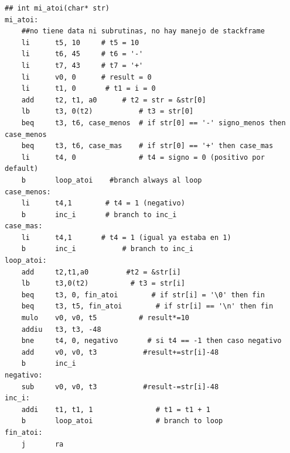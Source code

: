\documentclass[a4paper,10pt]{article}
\numberwithin{equation}{section}
\numberwithin{figure}{section}
\begin{document}
\begin{lstlisting}
## int mi_atoi(char* str)
mi_atoi:
    ##no tiene data ni subrutinas, no hay manejo de stackframe
    li      t5, 10     # t5 = 10
    li      t6, 45     # t6 = '-'
    li      t7, 43     # t7 = '+'
    li      v0, 0      # result = 0
    li		t1, 0		# t1 = i = 0
    add		t2, t1, a0		# t2 = str = &str[0]
    lb		t3, 0(t2)		    # t3 = str[0]
    beq		t3, t6, case_menos 	# if str[0] == '-' signo_menos then case_menos
    beq		t3, t6, case_mas	# if str[0] == '+' then case_mas
    li		t4, 0		        # t4 = signo = 0 (positivo por default)
    b       loop_atoi    #branch always al loop
case_menos:
    li		t4,1 		# t4 = 1 (negativo)
    b       inc_i       # branch to inc_i
case_mas:
    li      t4,1       # t4 = 1 (igual ya estaba en 1)
    b		inc_i			# branch to inc_i  
loop_atoi:
    add     t2,t1,a0         #t2 = &str[i]
    lb      t3,0(t2)          # t3 = str[i]
    beq     t3, 0, fin_atoi        # if str[i] = '\0' then fin
    beq		t3, t5, fin_atoi	    # if str[i] == '\n' then fin
    mulo	v0, v0, t5			# result*=10    
    addiu   t3, t3, -48
    bne     t4, 0, negativo       # si t4 == -1 then caso negativo
    add     v0, v0, t3           #result+=str[i]-48
    b       inc_i
negativo:
    sub     v0, v0, t3           #result-=str[i]-48
inc_i:
    addi	t1, t1, 1			    # t1 = t1 + 1
    b		loop_atoi			    # branch to loop
fin_atoi:
    j       ra
\end{lstlisting}
\end{document}
